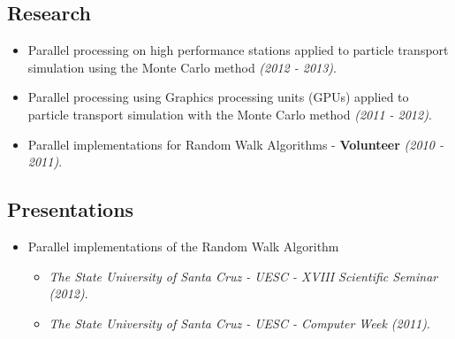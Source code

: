 \documentclass[10pt, a4paper, oneside, final]{scrartcl} %
\begin{document}
\subsection*{Research}

\begin{itemize}\itemsep1.0pt
\item Parallel processing on high performance stations applied to particle transport simulation using the Monte Carlo method \textit{(2012 - 2013)}.

\item Parallel processing using Graphics processing units (GPUs) applied to particle transport simulation with the Monte Carlo method \textit{(2011 - 2012)}.

\item Parallel implementations for Random Walk Algorithms - \textbf{Volunteer} \textit{(2010 - 2011)}.
\end{itemize}

\subsection*{Presentations}

\begin{itemize}\itemsep1.0pt
\item Parallel implementations of the Random Walk Algorithm

	\begin{itemize}
      \item \textit{The State University of Santa Cruz - UESC - XVIII Scientific Seminar (2012)}.
      \item \textit{The State University of Santa Cruz - UESC - Computer Week (2011)}.
	\end{itemize}
\end{itemize}


%
\end{document}
